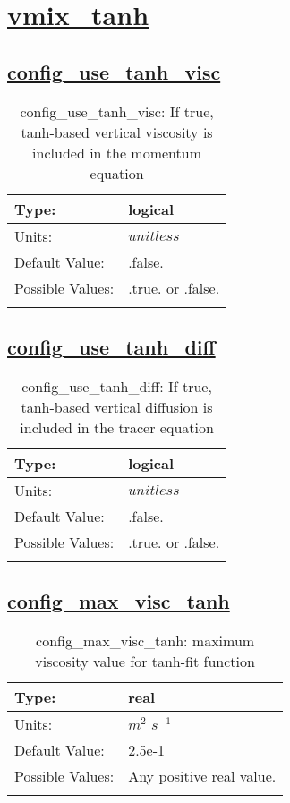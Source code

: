 \section[vmix\_tanh]{\hyperref[sec:nm_tab_vmix_tanh]{vmix\_tanh}}
\label{sec:nm_sec_vmix_tanh}
\subsection[config\_use\_tanh\_visc]{\hyperref[sec:nm_tab_vmix_tanh]{config\_use\_tanh\_visc}}
\label{subsec:nm_sec_config_use_tanh_visc}
\begin{center}
\begin{longtable}{| p{2.0in} || p{4.0in} |}
    \hline
    Type: & logical \\
    \hline
    Units: & $unitless$ \\
    \hline
    Default Value: & .false. \\
    \hline
    Possible Values: & .true. or .false. \\
    \hline
    \caption{config\_use\_tanh\_visc: If true, tanh-based vertical viscosity is included in the momentum equation}
\end{longtable}
\end{center}
\subsection[config\_use\_tanh\_diff]{\hyperref[sec:nm_tab_vmix_tanh]{config\_use\_tanh\_diff}}
\label{subsec:nm_sec_config_use_tanh_diff}
\begin{center}
\begin{longtable}{| p{2.0in} || p{4.0in} |}
    \hline
    Type: & logical \\
    \hline
    Units: & $unitless$ \\
    \hline
    Default Value: & .false. \\
    \hline
    Possible Values: & .true. or .false. \\
    \hline
    \caption{config\_use\_tanh\_diff: If true, tanh-based vertical diffusion is included in the tracer equation}
\end{longtable}
\end{center}
\subsection[config\_max\_visc\_tanh]{\hyperref[sec:nm_tab_vmix_tanh]{config\_max\_visc\_tanh}}
\label{subsec:nm_sec_config_max_visc_tanh}
\begin{center}
\begin{longtable}{| p{2.0in} || p{4.0in} |}
    \hline
    Type: & real \\
    \hline
    Units: & $m^2$ $s^{-1}$ \\
    \hline
    Default Value: & 2.5e-1 \\
    \hline
    Possible Values: & Any positive real value. \\
    \hline
    \caption{config\_max\_visc\_tanh: maximum viscosity value for tanh-fit function}
\end{longtable}
\end{center}
